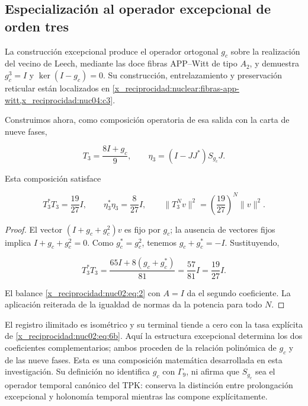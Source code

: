 \subsection{Especialización al operador excepcional de orden tres}

La construcción excepcional produce el operador ortogonal \(g_c\) sobre la realización del vecino de Leech, mediante las doce fibras APP–Witt de tipo \(A_2\), y demuestra \(g_c^3=I\) y \(\ker(I-g_c)=0\). Su construcción, entrelazamiento y preservación reticular están localizados en \cref{x_reciprocidad:nuclear:fibras-app-witt,x_reciprocidad:nuc04:c3}.

Construimos ahora, como composición operatoria de esa salida con la carta de nueve fases,

\[
T_3=\frac{8I+g_c}{9},\qquad
\eta_3=(I-JJ^*)S_{g_c}J.
\]

\begin{corollary}
Esta composición satisface

\begin{equation}
\boxed{T_3^*T_3=\frac{19}{27}I,\qquad
\eta_3^*\eta_3=\frac8{27}I,\qquad
\|T_3^Nv\|^2=\left(\frac{19}{27}\right)^N\|v\|^2.}\label{x_reciprocidad:nuc02:eq:6b}
\end{equation}
\end{corollary}

\begin{proof}
El vector \((I+g_c+g_c^2)v\) es fijo por \(g_c\); la ausencia de vectores fijos implica \(I+g_c+g_c^2=0\). Como \(g_c^*=g_c^2\), tenemos \(g_c+g_c^*=-I\). Sustituyendo,

\[
T_3^*T_3=\frac{65I+8(g_c+g_c^*)}{81}
=\frac{57}{81}I=\frac{19}{27}I.
\]

El balance \eqref{x_reciprocidad:nuc02:eq:2} con \(A=I\) da el segundo coeficiente. La aplicación reiterada de la igualdad de normas da la potencia para todo \(N\).
\end{proof}

El registro ilimitado es isométrico y su terminal tiende a cero con la tasa explícita de \eqref{x_reciprocidad:nuc02:eq:6b}. Aquí la estructura excepcional determina los dos coeficientes complementarios; ambos proceden de la relación polinómica de \(g_c\) y de las nueve fases. Esta es una composición matemática desarrollada en esta investigación. Su definición no identifica \(g_c\) con \(\Gamma_9\), ni afirma que \(S_{g_c}\) sea el operador temporal canónico del TPK: conserva la distinción entre prolongación excepcional y holonomía temporal mientras las compone explícitamente.

